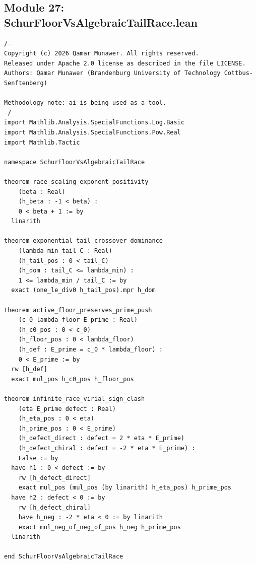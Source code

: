 \documentclass[11pt,a4paper]{article}
\begin{document}
\subsection*{Module 27: SchurFloorVsAlgebraicTailRace.lean}
\begin{lstlisting}[language=Lean4, caption={Schur Floor vs Algebraic Tail Race and Scaling Exponent Rigidity (Module 27)}]
/-
Copyright (c) 2026 Qamar Munawer. All rights reserved.
Released under Apache 2.0 license as described in the file LICENSE.
Authors: Qamar Munawer (Brandenburg University of Technology Cottbus-Senftenberg)

Methodology note: ai is being used as a tool.
-/
import Mathlib.Analysis.SpecialFunctions.Log.Basic
import Mathlib.Analysis.SpecialFunctions.Pow.Real
import Mathlib.Tactic

namespace SchurFloorVsAlgebraicTailRace

theorem race_scaling_exponent_positivity
    (beta : Real)
    (h_beta : -1 < beta) :
    0 < beta + 1 := by
  linarith

theorem exponential_tail_crossover_dominance
    (lambda_min tail_C : Real)
    (h_tail_pos : 0 < tail_C)
    (h_dom : tail_C <= lambda_min) :
    1 <= lambda_min / tail_C := by
  exact (one_le_div0 h_tail_pos).mpr h_dom

theorem active_floor_preserves_prime_push
    (c_0 lambda_floor E_prime : Real)
    (h_c0_pos : 0 < c_0)
    (h_floor_pos : 0 < lambda_floor)
    (h_def : E_prime = c_0 * lambda_floor) :
    0 < E_prime := by
  rw [h_def]
  exact mul_pos h_c0_pos h_floor_pos

theorem infinite_race_virial_sign_clash
    (eta E_prime defect : Real)
    (h_eta_pos : 0 < eta)
    (h_prime_pos : 0 < E_prime)
    (h_defect_direct : defect = 2 * eta * E_prime)
    (h_defect_chiral : defect = -2 * eta * E_prime) :
    False := by
  have h1 : 0 < defect := by
    rw [h_defect_direct]
    exact mul_pos (mul_pos (by linarith) h_eta_pos) h_prime_pos
  have h2 : defect < 0 := by
    rw [h_defect_chiral]
    have h_neg : -2 * eta < 0 := by linarith
    exact mul_neg_of_neg_of_pos h_neg h_prime_pos
  linarith

end SchurFloorVsAlgebraicTailRace
\end{lstlisting}
\end{document}
